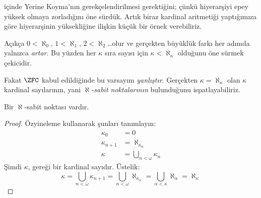 


 içinde Yerine Koyma'nın gerekçelendirilmesi
gerektiğini; çünkü hiyerarşiyi epey yüksek olmaya zorladığını öne sürdük.
Artık biraz kardinal aritmetiği yaptığımıza göre hiyerarşinin yüksekliğine
ilişkin küçük bir örnek verebiliriz.

Açıkça $0<\aleph_0$, $1<\aleph_1$, $2<\aleph_2$\ldots olur ve gerçekten
büyüklük farkı her adımda yalnızca \emph{artar}. Bu yüzden her $\kappa$
sıra sayısı için $\kappa<\aleph_\kappa$ olduğunu öne sürmek çekicidir.

Fakat $\ZFC$ kabul edildiğinde bu varsayım \emph{yanlıştır}. Gerçekten
$\kappa=\aleph_\kappa$ olan $\kappa$ kardinal sayılarının, yani
\emph{$\aleph$-sabit noktalarının} bulunduğunu ispatlayabiliriz.

\begin{prop}
Bir $\aleph$-sabit noktası vardır.
\end{prop}

\begin{proof}
Özyineleme kullanarak şunları tanımlayın:
\begin{align*}
	\kappa_0 &= 0\\
	\kappa_{n+1} &= \aleph_{\kappa_n}\\
	\kappa&= \bigcup_{n < \omega}\kappa_n
\end{align*}
Şimdi $\kappa$, 
gereği bir kardinal sayıdır. Üstelik:
\[
	\kappa= \bigcup_{n < \omega} \kappa_{n+1} =
	\bigcup_{n < \omega}\aleph_{\kappa_n} =
	\bigcup_{\alpha < \kappa}\aleph_\alpha = \aleph_\kappa
\]
\end{proof}

